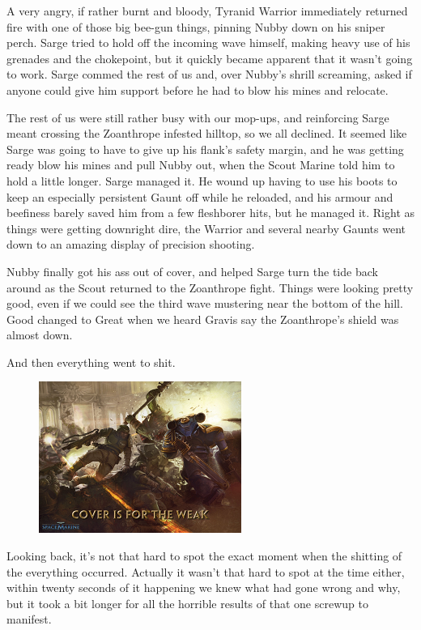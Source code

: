 A very angry, if rather burnt and bloody, Tyranid Warrior immediately returned fire with one of those big bee-gun things, pinning Nubby down on his sniper perch. 
Sarge tried to hold off the incoming wave himself, making heavy use of his grenades and the chokepoint, but it quickly became apparent that it wasn't going to work. 
Sarge commed the rest of us and, over Nubby's shrill screaming, asked if anyone could give him support before he had to blow his mines and relocate.

The rest of us were still rather busy with our mop-ups, and reinforcing Sarge meant crossing the Zoanthrope infested hilltop, so we all declined. 
It seemed like Sarge was going to have to give up his flank's safety margin, and he was getting ready blow his mines and pull Nubby out, when the Scout Marine told him to hold a little longer. 
Sarge managed it. 
He wound up having to use his boots to keep an especially persistent Gaunt off while he reloaded, and his armour and beefiness barely saved him from a few fleshborer hits, but he managed it. 
Right as things were getting downright dire, the Warrior and several nearby Gaunts went down to an amazing display of precision shooting.

Nubby finally got his ass out of cover, and helped Sarge turn the tide back around as the Scout returned to the Zoanthrope fight. 
Things were looking pretty good, even if we could see the third wave mustering near the bottom of the hill. 
Good changed to Great when we heard Gravis say the Zoanthrope's shield was almost down. 


And then everything went to shit.

\begin{figure}
	\begin{center}
		\includegraphics[width=\figwidth]{pics/12/45.png}
	\end{center}
\end{figure}
Looking back, it's not that hard to spot the exact moment when the shitting of the everything occurred. 
Actually it wasn't that hard to spot at the time either, within twenty seconds of it happening we knew what had gone wrong and why, but it took a bit longer for all the horrible results of that one screwup to manifest.

